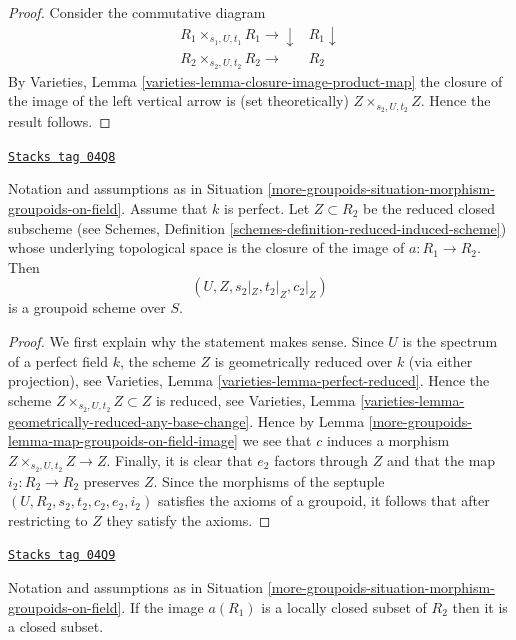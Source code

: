 \begin{proof}
Consider the commutative diagram
$$
\begin{array}{cc}R_1 \times_{s_1, U, t_1} R_1 \longrightarrow\downarrow & R_1 \downarrow \\ R_2 \times_{s_2, U, t_2} R_2 \longrightarrow & R_2\end{array}
$$
By
Varieties, Lemma \ref{varieties-lemma-closure-image-product-map}
the closure of the image of the left vertical arrow is (set theoretically)
$Z \times_{s_2, U, t_2} Z$.
Hence the result follows.
\end{proof}

\begin{lemma}
\label{more-groupoids-lemma-map-groupoids-on-perfect-field-image}
\href{https://stacks.math.columbia.edu/tag/04Q8}{\texttt{Stacks tag 04Q8}}

Notation and assumptions as in
Situation \ref{more-groupoids-situation-morphism-groupoids-on-field}.
Assume that $k$ is perfect.
Let $Z \subset R_2$ be the reduced closed subscheme (see
Schemes, Definition \ref{schemes-definition-reduced-induced-scheme})
whose underlying topological space is the closure of the image of
$a : R_1 \to R_2$. Then
$$
(U, Z, s_2|_Z, t_2|_Z, c_2|_Z)
$$
is a groupoid scheme over $S$.
\end{lemma}

\begin{proof}
We first explain why the statement makes sense. Since $U$ is the spectrum
of a perfect field $k$, the scheme $Z$ is geometrically reduced
over $k$ (via either projection), see
Varieties, Lemma \ref{varieties-lemma-perfect-reduced}.
Hence the scheme $Z \times_{s_2, U, t_2} Z \subset Z$
is reduced, see
Varieties, Lemma \ref{varieties-lemma-geometrically-reduced-any-base-change}.
Hence by
Lemma \ref{more-groupoids-lemma-map-groupoids-on-field-image}
we see that $c$ induces a morphism
$Z \times_{s_2, U, t_2} Z \to Z$.
Finally, it is clear that $e_2$ factors through $Z$
and that the map $i_2 : R_2 \to R_2$ preserves $Z$. Since the morphisms
of the septuple
$(U, R_2, s_2, t_2, c_2, e_2, i_2)$
satisfies the axioms of a groupoid, it follows that after restricting
to $Z$ they satisfy the axioms.
\end{proof}

\begin{lemma}
\label{more-groupoids-lemma-locally-closed-image-is-closed}
\href{https://stacks.math.columbia.edu/tag/04Q9}{\texttt{Stacks tag 04Q9}}

Notation and assumptions as in
Situation \ref{more-groupoids-situation-morphism-groupoids-on-field}.
If the image $a(R_1)$ is a locally closed subset of $R_2$
then it is a closed subset.
\end{lemma}

